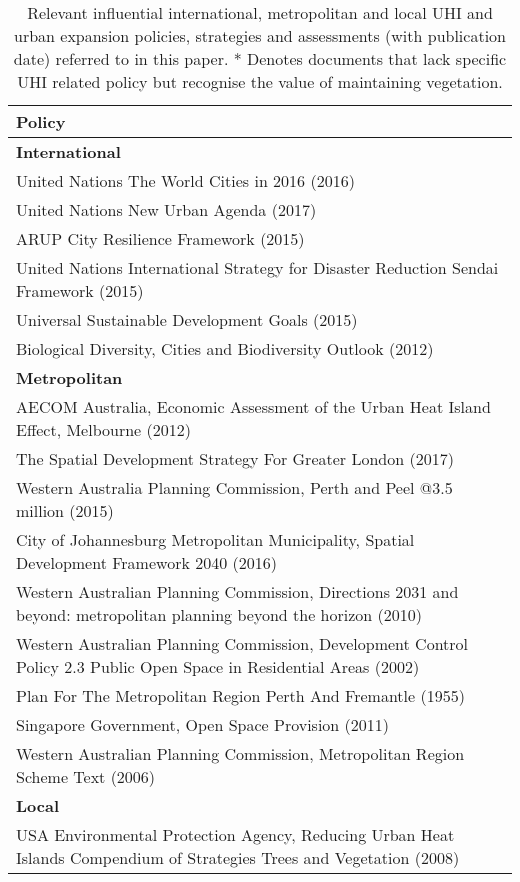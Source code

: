 \documentclass[
  12pt,
  oneside]{book}
\begin{document}
\begin{longtabu} to 
\caption{\label{tab:kable}Relevant influential international, metropolitan and local UHI and urban expansion policies, strategies and assessments (with publication date) referred to in this paper. * Denotes documents that lack specific UHI related policy but recognise the value of maintaining vegetation.}\\
\toprule
\textbf{Policy}\\
\midrule
\textbf{International}\\
\midrule
United Nations The World Cities in 2016 (2016)\\
United Nations New Urban Agenda (2017)\\
ARUP City Resilience Framework (2015)\\
United Nations International Strategy for Disaster Reduction Sendai Framework (2015)\\
\addlinespace
Universal Sustainable Development Goals (2015)\\
Biological Diversity, Cities and Biodiversity Outlook (2012)\\
\textbf{Metropolitan}\\
\midrule
AECOM Australia, Economic Assessment of the Urban Heat Island Effect, Melbourne (2012)\\
The Spatial Development Strategy For Greater London (2017)\\
\addlinespace
Western Australia Planning Commission, Perth and Peel @3.5 million (2015)\\
City of Johannesburg Metropolitan Municipality, Spatial Development Framework 2040 (2016)\\
Western Australian Planning Commission, Directions 2031 and beyond: metropolitan planning beyond the horizon (2010)\\
Western Australian Planning Commission, Development Control Policy 2.3 Public Open Space in Residential Areas (2002)\\
Plan For The Metropolitan Region Perth And Fremantle (1955)\\
\addlinespace
Singapore Government, Open Space Provision (2011)\\
Western Australian Planning Commission, Metropolitan Region Scheme Text (2006)\\
\textbf{Local}\\
\midrule
USA Environmental Protection Agency, Reducing Urban Heat Islands Compendium of Strategies Trees and Vegetation (2008)\\

\end{longtabu}
\end{document}
